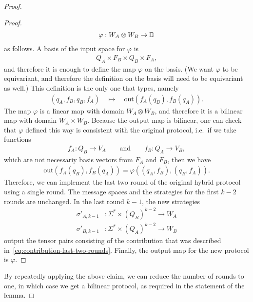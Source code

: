 \begin{proof}
\begin{proof}
        \begin{align*}
        \varphi : W_A \otimes W_B \to \mathbb D
        \end{align*}
        as follows. A basis of the input space for $\varphi$ is 
        \begin{align*}
        Q_A \times F_B \times Q_B \times F_A,
        \end{align*}
        and therefore it is enough to define the map $\varphi$ on the basis. (We want $\varphi$ to be equivariant, and therefore the definition on the basis will need to be equivariant as well.) This definition is the only one that types, namely 
        \begin{align*}
        (q_A, f_B, q_B, f_A) \quad 
        \mapsto \quad 
        \text{out}(f_A(q_B), f_B(q_A)).
        \end{align*}
        The map $\varphi$ is a linear map with domain $W_A \otimes W_B$, and therefore it is a bilinear map with domain $W_A \times W_B$. Because the output map is bilinear, one can check that $\varphi$ defined this way is consistent with the original protocol, i.e.~if we take functions 
        \begin{align*}
        f_A : Q_B \to V_A \qquad \text{and} \qquad f_B : Q_A \to V_B,
        \end{align*}
        which are not necessariy basis vectors from $F_A$ and $F_B$, then we have 
        \begin{align*}
        \text{out}(f_A(q_B), f_B(q_A)) = \varphi((q_A, f_B), (q_B, f_A)).
        \end{align*}
        Therefore, we can implement the last two round of the original hybrid protocol using a single round. The message spaces and the strategies for the first $k-2$ rounds are unchanged. In the last round $k-1$, the new strategies
        \begin{align*}
        \sigma'_{A,k-1} & : \Sigma^* \times (Q_B)^{k-2} \to W_A\\
        \sigma'_{B,k-1} & : \Sigma^* \times (Q_A)^{k-2} \to W_B
        \end{align*}
        output the tensor pairs consisting of the contribution that was described in~\eqref{eq:contribution-last-two-rounds}. Finally, the output  map for the new protocol is $\varphi$. 
    \end{proof}

    By repeatedly applying the above claim, we can reduce the number of rounds to one, in which case we get a bilinear protocol, as required in the statement of the lemma. 
\end{proof}


